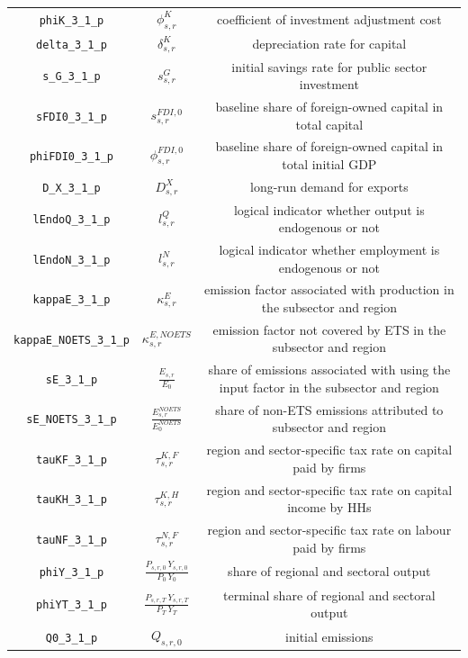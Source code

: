 \begin{center}
\begin{longtable}{ccc}
\texttt{phiK\_3\_1\_p} & ${\phi^{K}_{s,r}}$ & coefficient of investment adjustment cost\\
\texttt{delta\_3\_1\_p} & ${\delta^{K}_{s,r}}$ & depreciation rate for capital\\
\texttt{s\_G\_3\_1\_p} & ${s^{G}_{s,r}}$ & initial savings rate for public sector investment\\
\texttt{sFDI0\_3\_1\_p} & ${s^{FDI,0}_{s,r}}$ & baseline share of foreign-owned capital in total capital\\
\texttt{phiFDI0\_3\_1\_p} & ${\phi^{FDI,0}_{s,r}}$ & baseline share of foreign-owned capital in total initial GDP\\
\texttt{D\_X\_3\_1\_p} & ${D^{X}_{s,r}}$ & long-run demand for exports\\
\texttt{lEndoQ\_3\_1\_p} & ${l^{Q}_{s,r}}$ & logical indicator whether output is endogenous or not\\
\texttt{lEndoN\_3\_1\_p} & ${l^{N}_{s,r}}$ & logical indicator whether employment is endogenous or not\\
\texttt{kappaE\_3\_1\_p} & ${\kappa^{E}_{s,r}}$ & emission factor associated with production in the subsector and region\\
\texttt{kappaE\_NOETS\_3\_1\_p} & ${\kappa^{E,NOETS}_{s,r}}$ & emission factor not covered by ETS in the subsector and region\\
\texttt{sE\_3\_1\_p} & ${\frac{E_{s,r}}{E_0}}$ & share of emissions associated with using the input factor in the subsector and region\\
\texttt{sE\_NOETS\_3\_1\_p} & ${\frac{E^{NOETS}_{s,r}}{E^{NOETS}_0}}$ & share of non-ETS emissions attributed to subsector and region\\
\texttt{tauKF\_3\_1\_p} & ${\tau^{K,F}_{s,r}}$ & region and sector-specific tax rate on capital paid by firms\\
\texttt{tauKH\_3\_1\_p} & ${\tau^{K,H}_{s,r}}$ & region and sector-specific tax rate on capital income by HHs\\
\texttt{tauNF\_3\_1\_p} & ${\tau^{N,F}_{s,r}}$ & region and sector-specific tax rate on labour paid by firms\\
\texttt{phiY\_3\_1\_p} & $\frac{P_{s,r,0} \, Y_{s,r,0}}{P_{0} \, Y_{0}}$ & share of regional and sectoral output\\
\texttt{phiYT\_3\_1\_p} & $\frac{P_{s,r,T} \, Y_{s,r,T}}{P_{T} \, Y_{T}}$ & terminal share of regional and sectoral output\\
\texttt{Q0\_3\_1\_p} & ${Q_{s,r,0}}$ & initial emissions\\

\end{longtable}
\end{center}
